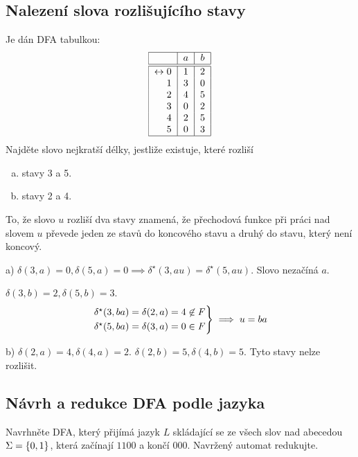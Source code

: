 \subsection{Nalezení slova rozlišujícího stavy}
Je dán DFA tabulkou:
\[
\begin{tabular}{|r|c|c|}
    \hline
    & $a$ & $b$\\
    \hline
    \hline
    $\leftrightarrow 0$& $1$ & $2$\\
    $1$                & $3$ & $0$\\
    $2$                & $4$ & $5$\\
    $3$                & $0$ & $2$\\
    $4$                & $2$ & $5$\\
    $5$                & $0$ & $3$\\
    \hline
\end{tabular}
\]
Najděte slovo nejkratší délky, jestliže existuje, které rozliší
\begin{enumerate}[a), noitemsep]
    \item stavy 3 a 5.
    \item stavy 2 a 4.
\end{enumerate}
To, že slovo $u$ rozliší dva stavy znamená, že přechodová funkce při práci nad slovem $u$ převede jeden ze stavů do
koncového stavu a druhý do stavu, který není koncový.

a) $\delta(3,a) = 0, \delta(5,a)=0 \implies \delta^\star(3, au) = \delta^\star (5, au)$.
Slovo nezačíná $a$.

$\delta(3,b) = 2, \delta(5, b) = 3$.
\[
\begin{rcases*}
\delta^\star(3,ba) = \delta(2,a) = 4 \not\in F\\
\delta^\star(5,ba) = \delta(3,a) = 0 \in F
\end{rcases*} \implies u = ba
\]

b) $\delta(2,a) = 4, \delta(4,a) =2$. $\delta(2,b)=5, \delta(4,b)=5$. Tyto stavy nelze rozlišit.

\subsection{Návrh a redukce DFA podle jazyka}
Navrhněte DFA, který přijímá jazyk $L$ skládající se ze všech slov nad abecedou $\Sigma = \left\lbrace 0, 1 \right\rbrace$, která začínají
$1100$ a končí $000$. Navržený automat redukujte.


